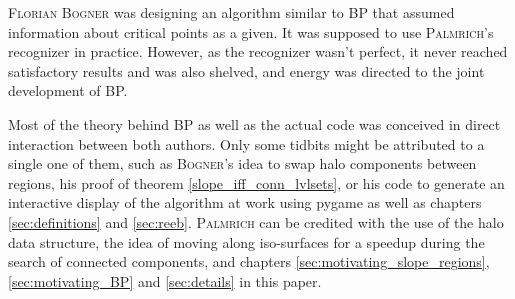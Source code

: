 \documentclass[a4paper,12pt,notitlepage,fullpage]{paper}
\theoremstyle{plain}
\theoremstyle{definition}
\begin{document}
\textsc{Florian Bogner} was designing an algorithm similar to BP that assumed information about critical points as a given. It was supposed to use \textsc{Palmrich}'s recognizer in practice. However, as the recognizer wasn't perfect, it never reached satisfactory results and was also shelved, and energy was directed to the joint development of BP.

Most of the theory behind BP as well as the actual code was conceived in direct interaction between both authors. Only some tidbits might be attributed to a single one of them, such as \textsc{Bogner}'s idea to swap halo components between regions, his proof of theorem \ref{slope_iff_conn_lvlsets}, or his code to generate an interactive display of the algorithm at work using pygame as well as chapters \ref{sec:definitions} and \ref{sec:reeb}. \textsc{Palmrich} can be credited with the use of the halo data structure, the idea of moving along iso-surfaces for a speedup during the search of connected components, and chapters \ref{sec:motivating_slope_regions}, \ref{sec:motivating_BP} and \ref{sec:details} in this paper.




\end{document}
